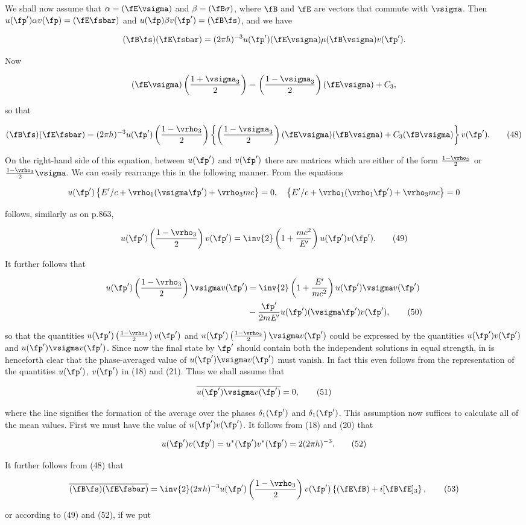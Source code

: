 \documentclass{article}
\newcommand{\nequ}[2]{
\begin{align*}
#1
\tag{#2}
\end{align*}
}
\newcommand{\uequ}[1]{
\begin{align*}
#1
\end{align*}
}
\begin{document}
We shall now assume that $\alpha = (\fE\vsigma)$ and $\beta = (\fB \sigma)$, where $\fB$ and $\fE$ are vectors that commute with $\vsigma$. Then $u(\fp')\alpha v(\fp) = (\fE\fsbar)$ and $u(\fp)\beta v(\fp') = (\fB \fs)$, and we have
\uequ{
(\fB\fs)(\fE\fsbar) = (2\pi h)^{-3}u(\fp')(\fE\vsigma)\mu(\fB\vsigma)v(\fp').
}
Now
\uequ{
(\fE\vsigma)\left(\frac{1+\vsigma_3}{2}\right) = \left(\frac{1-\vsigma_3}{2}\right)(\fE\vsigma) + C_3,
}
so that
\nequ{
(\fB\fs)(\fE\fsbar) = (2\pi h)^{-3} u(\fp')\left(\frac{1-\vrho_3}{2}\right)\left\{
\left(\frac{1-\vsigma_3}{2}\right)(\fE\vsigma)(\fB\vsigma) + C_3(\fB\vsigma)\right\}v(\fp').
}{48}
On the right-hand side of this equation, between $u(\fp')$ and $v(\fp')$ there are matrices which are either of the form $\frac{1-\vrho_3}{2}$ or $\frac{1-\vrho_3}{2}\vsigma$. We can easily rearrange this in the following manner. From the equations
\uequ{
u(\fp')\left\{E'/c + \vrho_1(\vsigma\fp') + \vrho_3 mc \right\} = 0,\quad
\left\{E'/c + \vrho_1(\vrho_1\fp') + \vrho_3 mc\right\} = 0
}
follows, similarly as on p.863,
\nequ{
u(\fp')\left(\frac{1-\vrho_3}{2}\right)v(\fp') =
\inv{2}\left(1+\frac{mc^2}{E'}\right)u(\fp')v(\fp').
}{49}
It further follows that
\nequ{
u(\fp')\left(\frac{1-\vrho_3}{2}\right)\vsigma v(\fp') &=
\inv{2}\left(1+\frac{E'}{mc^2}\right)u(\fp')\vsigma v(\fp') \\
&- \frac{\fp'}{2mE'}u(\fp')(\vsigma \fp')v(\fp'),
}{50}
so that the quantities $u(\fp')\left(\frac{1-\vrho_3}{2}\right)v(\fp')$ and $u(\fp')\left(\frac{1-\vrho_3}{2}\right)\vsigma v(\fp')$ could be expressed by the quantities $u(\fp')v(\fp')$ and $u(\fp')\vsigma v(\fp')$. Since now the final state  by $\fp'$ should contain both the independent solutions in equal strength, in is henceforth clear that the phase-averaged value of $u(\fp')\vsigma v(\fp')$ must vanish. In fact this even follows from the representation of the quantities $u(\fp')$, $v(\fp')$ in (18) and (21). Thus we shall assume that
\nequ{
\overline{u(\fp')\vsigma v(\fp')} = 0,
}{51}
where the line signifies the formation of the average over the phases $\delta_1(\fp')$ and $\delta_1(\fp')$. This assumption now suffices to calculate all of the mean values. First we must have the value of $u(\fp')v(\fp')$. It follows from (18) and (20) that
\nequ{
u(\fp')v(\fp') = u^*(\fp')v^*(\fp') = 2(2\pi h)^{-3}.
}{52}
It further follows from (48) that
\nequ{
\overline{(\fB\fs)}\overline{(\fE\fsbar)} = \inv{2}
(2\pi h)^{-3} u(\fp')
\left(\frac{1-\vrho_3}{2}\right)v(\fp')\left\{(\fE\fB) + i[\fB\fE]_3 \right\},
}{53}
or according to (49) and (52), if we put
\end{document}
